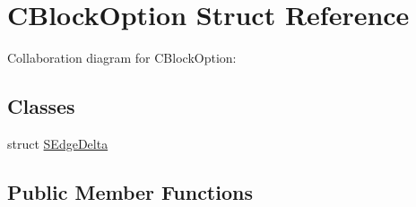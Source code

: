 \hypertarget{struct_c_block_option}{\section{C\+Block\+Option Struct Reference}
\label{struct_c_block_option}
}


Collaboration diagram for C\+Block\+Option\+:
\subsection*{Classes}
\begin{DoxyCompactItemize}
\item 
struct \hyperlink{struct_c_block_option_1_1_s_edge_delta}{S\+Edge\+Delta}
\end{DoxyCompactItemize}
\subsection*{Public Member Functions}
